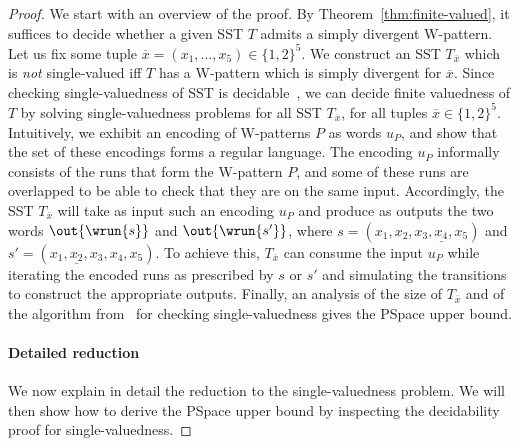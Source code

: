 \documentclass{article}
\newcommand{\RestateGo}[1]{\renewcommand{#1}{(Restated)}}
\begin{document}
\RestateGo{\restateEffectiveness}
\Effectiveness*


\begin{proof}
    We start with an overview of the proof.
    By Theorem~\ref{thm:finite-valued}, it suffices to decide
    whether a given SST $T$ admits a simply divergent
    W-pattern. Let us fix some tuple $\overline{x} =
    (x_1,\dots,x_5)\in\{1,2\}^5$. We construct an SST
    $T_{\overline{x}}$ which is \emph{not} single-valued iff $T$
    has a W-pattern which is simply divergent for $\overline{x}$. 
    Since checking single-valuedness of SST is 
    decidable~\cite{DBLP:conf/icalp/AlurD11}, 
    we can decide finite valuedness of $T$
    by solving single-valuedness problems
    for all SST $T_{\overline{x}}$, for all tuples
    $\overline{x}\in \{1,2\}^5$.
	Intuitively, we exhibit an encoding of
    W-patterns $P$ as words $u_P$,
    and show that the set of these encodings forms a regular language. 
    The encoding $u_P$ informally consists of the 
    runs that form the W-pattern $P$, and
    some of these runs
    are overlapped to be able to check that they are on the same input. 
    Accordingly, the SST $T_{\overline{x}}$ will take as 
    input such an encoding $u_P$ and produce as outputs the 
    two words 
    $\out{\wrun{s}}$ and $\out{\wrun{s'}}$,
    where $s = (x_1,x_2,x_3,\underline{x_4},x_5)$ and 
    $s' = (x_1,\underline{x_2},x_3,x_4,x_5)$. 
	To achieve this, $T_{\overline{x}}$ can consume the input $u_P$
    while iterating the encoded runs as prescribed by $s$ or $s'$
    and simulating the transitions to construct the appropriate outputs.
    Finally, an analysis of the size of $T_{\overline{x}}$ and of the 
    algorithm from~\cite{DBLP:conf/icalp/AlurD11} 
    for checking single-valuedness gives the {\upshape\sc PSpace} upper bound.



    \paragraph{Detailed reduction} 
    We now explain in detail the reduction to
    the single-valuedness problem. We will 
    then show how to derive the {\upshape\sc PSpace} upper bound 
    by inspecting the decidability proof for single-valuedness. 


\end{proof}
\end{document}
